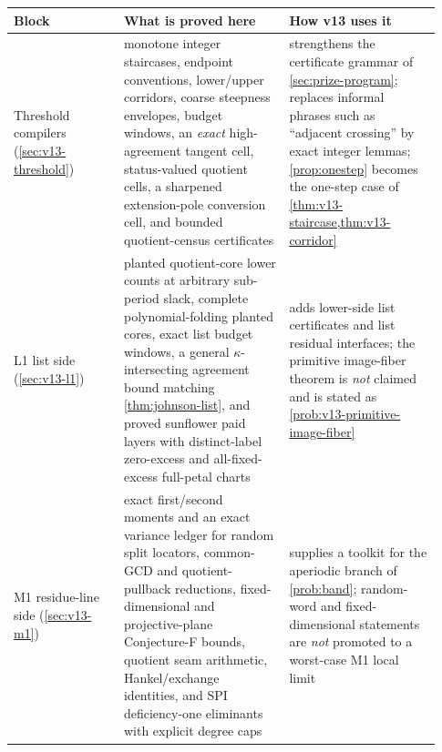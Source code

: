 \begin{center}
\small
\begin{tabular}{@{}p{0.24\linewidth}p{0.36\linewidth}p{0.33\linewidth}@{}}
\toprule
Block & What is proved here & How v13 uses it \\
\midrule
Threshold compilers (\cref{sec:v13-threshold}) & monotone integer staircases, endpoint conventions, lower/upper corridors, coarse steepness envelopes, budget windows, an \emph{exact} high-agreement tangent cell, status-valued quotient cells, a sharpened extension-pole conversion cell, and bounded quotient-census certificates & strengthens the certificate grammar of \cref{sec:prize-program}; replaces informal phrases such as ``adjacent crossing'' by exact integer lemmas; \cref{prop:onestep} becomes the one-step case of \cref{thm:v13-staircase,thm:v13-corridor} \\
\addlinespace
L1 list side (\cref{sec:v13-l1}) & planted quotient-core lower counts at arbitrary sub-period slack, complete polynomial-folding planted cores, exact list budget windows, a general $\kappa$-intersecting agreement bound matching \cref{thm:johnson-list}, and proved sunflower paid layers with distinct-label zero-excess and all-fixed-excess full-petal charts & adds lower-side list certificates and list residual interfaces; the primitive image-fiber theorem is \emph{not} claimed and is stated as \cref{prob:v13-primitive-image-fiber} \\
\addlinespace
M1 residue-line side (\cref{sec:v13-m1}) & exact first/second moments and an exact variance ledger for random split locators, common-GCD and quotient-pullback reductions, fixed-dimensional and projective-plane Conjecture-F bounds, quotient seam arithmetic, Hankel/exchange identities, and SPI deficiency-one eliminants with explicit degree caps & supplies a toolkit for the aperiodic branch of \cref{prob:band}; random-word and fixed-dimensional statements are \emph{not} promoted to a worst-case M1 local limit \\
\bottomrule
\end{tabular}
\end{center}

